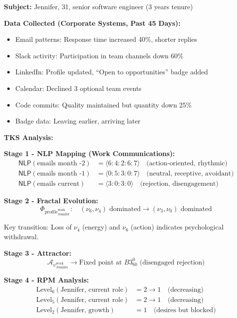 \documentclass[11pt,twoside]{book}
\newcommand{\noe}[1]{\nu_{#1}}
\newcommand{\PsychAttractor}{\mathcal{A}_\psi}
\newcommand{\NLP}{\mathsf{NLP}}
\newcommand{\ProfileFrac}{\Phi_{\mathrm{profile}}}
\begin{document}
\begin{tcolorbox}[colback=yellow!5!white,colframe=yellow!65!black,title=\textbf{Scenario: Predicting Jennifer's Resignation},breakable]

\textbf{Subject:} Jennifer, 31, senior software engineer (3 years tenure)

\textbf{Data Collected (Corporate Systems, Past 45 Days):}
\begin{itemize}
    \item Email patterns: Response time increased 40\%, shorter replies
    \item Slack activity: Participation in team channels down 60\%
    \item LinkedIn: Profile updated, ``Open to opportunities'' badge added
    \item Calendar: Declined 3 optional team events
    \item Code commits: Quality maintained but quantity down 25\%
    \item Badge data: Leaving earlier, arriving later
\end{itemize}

\textbf{TKS Analysis:}

\textbf{Stage 1 - NLP Mapping (Work Communications):}
\begin{align*}
    \NLP(\text{emails month -2}) &= \langle 6:4:2:6:7 \rangle \quad \text{(action-oriented, rhythmic)} \\
    \NLP(\text{emails month -1}) &= \langle 0:5:3:0:7 \rangle \quad \text{(neutral, receptive, avoidant)} \\
    \NLP(\text{emails current}) &= \langle 3:0:3:0 \rangle \quad \text{(rejection, disengagement)}
\end{align*}

\textbf{Stage 2 - Fractal Evolution:}
\[
    \ProfileFrac_{\text{Jennifer}}^{\text{work}} : \quad (\noe{6}, \noe{4}) \text{ dominated} \to (\noe{3}, \noe{0}) \text{ dominated}
\]

Key transition: Loss of $\noe{4}$ (energy) and $\noe{6}$ (action) indicates psychological withdrawal.

\textbf{Stage 3 - Attractor:}
\[
    \PsychAttractor_{\text{Jennifer}}^{\text{work}} \to \text{Fixed point at } B3^0_{6b} \text{ (disengaged rejection)}
\]

\textbf{Stage 4 - RPM Analysis:}
\begin{align*}
    \mathrm{Level}_6(\text{Jennifer, current role}) &= 2 \to 1 \quad \text{(decreasing)} \\
    \mathrm{Level}_5(\text{Jennifer, current role}) &= 2 \to 1 \quad \text{(decreasing)} \\
    \mathrm{Level}_2(\text{Jennifer, growth}) &= 1 \quad \text{(desires but blocked)}
\end{align*}


\end{tcolorbox}
\end{document}
